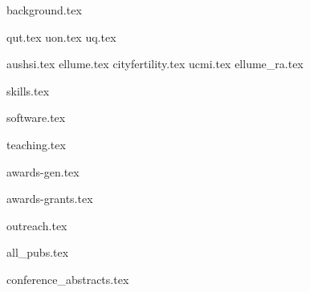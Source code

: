 \documentclass[11pt]{article}
\begin{document}
{background.tex}

{qut.tex}
{uon.tex}
{uq.tex}

\vspace{1mm}
{aushsi.tex}
{ellume.tex}
{cityfertility.tex}
{ucmi.tex}
{ellume_ra.tex}

\vspace{1mm}
{skills.tex}

\vspace{1mm}
{software.tex}

\vspace{1mm}
{teaching.tex}

\vspace{1mm}
{awards-gen.tex}

\vspace{1mm}
{awards-grants.tex}

\vspace{1mm}
{outreach.tex}

\vspace{1mm}
\begin{enumerate}
	{all_pubs.tex}
\end{enumerate}\par

\vspace{1mm}
{conference_abstracts.tex}
\end{document}
